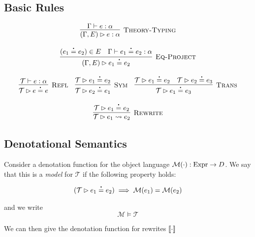 \documentclass[runningheads]{llncs}
\begin{document}
\subsection{Basic Rules}
\[
  \begin{array}{c}
    \labinfer[Theory-Typing]{(\Gamma, E) \tentail e : \alpha}{\Gamma \vdash e : \alpha}
    \\\\
    \labinfer[Eq-Project]{(\Gamma, E) \tentail e_1 \eq e_2}{(e_1 \eq e_2) \in E & \Gamma \vdash e_1 \eq e_2 : \alpha}
    \\\\
    \labinfer[Refl]{\mathcal{T} \tentail e \eq e}{\mathcal{T} \vdash e : \alpha}
    ~~~
    \labinfer[Sym]{\mathcal{T} \tentail e_2 \eq e_1}{\mathcal{T} \tentail e_1 \eq e_2}
    ~~~
    \labinfer[Trans]{\mathcal{T} \tentail e_1 \eq e_3}{\mathcal{T} \tentail e_1 \eq e_2 & \mathcal{T} \tentail e_2 \eq e_3}
    \\\\
    \labinfer[Rewrite]{\mathcal{T} \tentail e_1 \rewrite e_2}{\mathcal{T} \tentail e_1 \eq e_2}
  \end{array}
\]

\subsection{Denotational Semantics}

Consider a denotation function for the object language $\mathcal{M}(\cdot) : \textnormal{Expr} \rightarrow D$. We
say that this is a \textit{model} for $\mathcal{T}$ if the following property holds:

\[
  \begin{array}{c}
    (\mathcal{T} \tentail e_1 \eq e_2) \implies \mathcal{M}(e_1) = \mathcal{M}(e_2)
  \end{array}
\]

\noindent
and we write
\[
  \mathcal{M} \models \mathcal{T}
\]

%
%
%
\noindent
We can then give the denotation function for rewrites $\llbracket \cdot \rrbracket$
\end{document}
